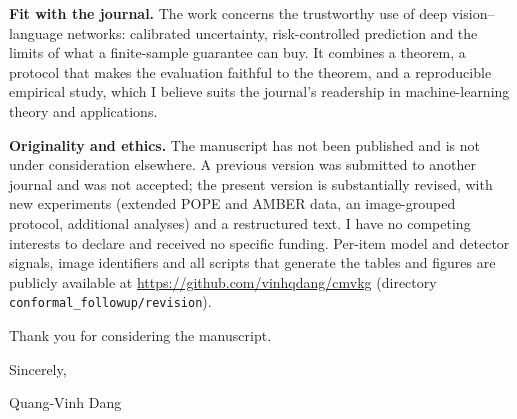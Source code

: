 \documentclass[10.5pt,a4paper]{article}
\begin{document}
\textbf{Fit with the journal.} The work concerns the trustworthy use of deep vision--language networks: calibrated uncertainty, risk-controlled prediction and the limits of what a
finite-sample guarantee can buy. It combines a theorem, a protocol that makes the evaluation faithful to the theorem, and a reproducible empirical study, which I believe suits the journal's readership in
machine-learning theory and applications.

\textbf{Originality and ethics.} The manuscript has not been published and is not under consideration elsewhere. A previous version was submitted to another journal and was not
accepted; the present version is substantially revised, with new experiments (extended POPE and AMBER data, an image-grouped protocol, additional analyses) and a restructured text. I have no competing interests to declare and
received no specific funding. Per-item model and detector signals, image identifiers and all scripts that generate the tables and figures are publicly available at
\url{https://github.com/vinhqdang/cmvkg} (directory \texttt{conformal\_followup/revision}).

Thank you for considering the manuscript.

Sincerely,

Quang-Vinh Dang
\end{document}
